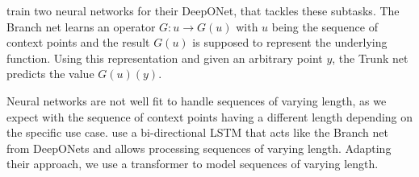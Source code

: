 \citet{Lu_2021} train two neural networks for their DeepONet, that tackles these subtasks. The Branch net learns an operator $G: u\rightarrow G(u)$ with $u$ being the sequence of context points and the result $G(u)$ is supposed to represent the underlying function. Using this representation and given an arbitrary point $y$, the Trunk net predicts the value $G(u)(y)$. \cite{Lu_2021}

Neural networks are not well fit to handle sequences of varying length, as we expect with the sequence of context points having a different length depending on the specific use case. \citet{seifner2025zeroshotimputationfoundationinference} use a bi-directional LSTM that acts like the Branch net from DeepONets and allows processing sequences of varying length. Adapting their approach, we use a transformer to model sequences of varying length.